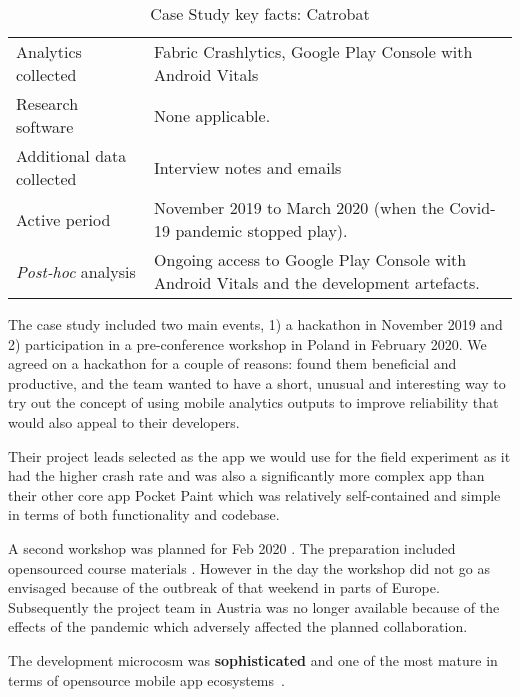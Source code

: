 {\begin{table*}
\begin{tabular}{lp{11cm}}
       Analytics collected &Fabric Crashlytics, Google Play Console with Android Vitals \\
       Research software & None applicable. \\
       Additional data collected &Interview notes and emails \\
       Active period & November 2019 to March 2020 (when the Covid-19 pandemic stopped play). \\
       \arrayrulecolor{blue!20}\midrule
       \emph{Post-hoc} analysis & Ongoing access to Google Play Console with Android Vitals and the development artefacts. \\
       \bottomrule
    \end{tabular}
    \caption{Case Study key facts: Catrobat}
    \label{tab:catrobat_case_study_anaytics_overview}
\end{table*}
}

    
The case study included two main events, 1) a hackathon in November 2019 and 2) participation in a pre-conference workshop in Poland in February 2020. We agreed on a hackathon for a couple of reasons:  found them beneficial and productive, and the  team wanted to have a short, unusual and interesting way to try out the concept of using mobile analytics outputs to improve reliability that would also appeal to their developers. 

Their project leads selected  as the app we would use for the field experiment as it had the higher crash rate and was also a significantly more complex app than their other core app Pocket Paint which was relatively self-contained and simple in terms of both functionality and codebase.

A second workshop was planned for  Feb 2020 . The preparation included opensourced course materials . However in the day the workshop did not go as envisaged because of the outbreak of  that weekend in parts of Europe. Subsequently the project team in Austria was no longer available because of the effects of the pandemic which adversely affected the planned collaboration.

The development microcosm was \textbf{sophisticated} and one of the most mature in terms of opensource mobile app ecosystems~.  %

